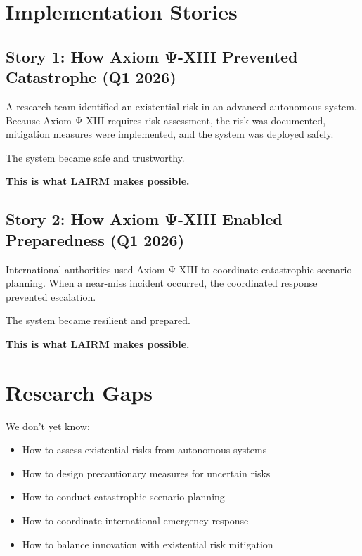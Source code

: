 \vspace{0.5cm}

\section{Implementation Stories}

\subsection{Story 1: How Axiom Ψ-XIII Prevented Catastrophe (Q1 2026)}

A research team identified an existential risk in an advanced autonomous system. Because Axiom Ψ-XIII requires risk assessment, the risk was documented, mitigation measures were implemented, and the system was deployed safely.

The system became safe and trustworthy.

\textbf{This is what LAIRM makes possible.}

\subsection{Story 2: How Axiom Ψ-XIII Enabled Preparedness (Q1 2026)}

International authorities used Axiom Ψ-XIII to coordinate catastrophic scenario planning. When a near-miss incident occurred, the coordinated response prevented escalation.

The system became resilient and prepared.

\textbf{This is what LAIRM makes possible.}

\vspace{0.5cm}

\section{Research Gaps}

We don't yet know:

\begin{itemize}
    \item How to assess existential risks from autonomous systems
    
    \item How to design precautionary measures for uncertain risks
    
    \item How to conduct catastrophic scenario planning
    
    \item How to coordinate international emergency response
    
    \item How to balance innovation with existential risk mitigation
\end{itemize}

